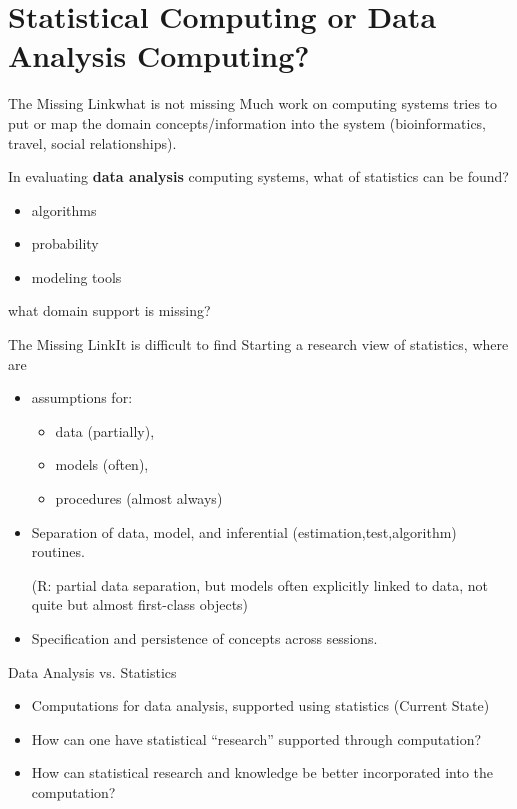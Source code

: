 \documentclass{beamer}
\begin{document}
\section{Statistical Computing or Data Analysis Computing?}

\begin{frame}{The Missing Link}{what is not missing}
  Much work on computing systems tries to put or map the domain
  concepts/information into the system (bioinformatics, travel, social
  relationships).  

  In evaluating \textbf{data analysis} computing systems, what of
  statistics can be found?
  \begin{itemize}
  \item algorithms
  \item probability
  \item modeling tools
  \end{itemize}
  what domain support is missing?
\end{frame}

\begin{frame}{The Missing Link}{It is difficult to find}
  Starting a research view of statistics, where are
  \begin{itemize}
  \item assumptions for:
    \begin{itemize}
    \item  data (partially),
    \item  models (often),
    \item  procedures (almost always)
    \end{itemize}
  \item Separation of data, model, and inferential
    (estimation,test,algorithm) routines.

    (R: partial data separation, but models often explicitly linked to
    data, not quite but almost first-class objects)
  \item Specification and persistence of concepts across sessions.
  \end{itemize}
\end{frame}

\begin{frame}{Data Analysis vs. Statistics}

  \begin{itemize}
  \item Computations for data analysis, supported using statistics
    (Current State)
  \item How can one have statistical ``research'' supported through
    computation?
  \item How can statistical research and knowledge be better
    incorporated into the computation?
  \end{itemize}
\end{frame}
\end{document}
